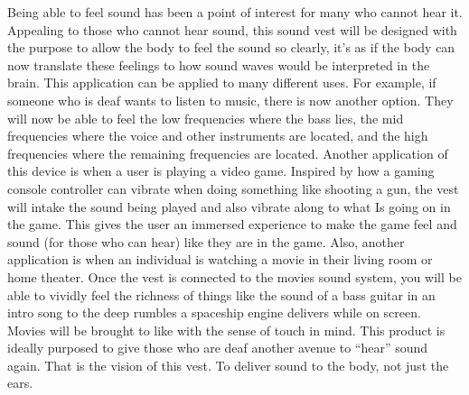 Being able to feel sound has been a point of interest for many who cannot hear it. Appealing to those who cannot hear sound, this sound vest will be designed with the purpose to allow the body to feel the sound so clearly, it’s as if the body can now translate these feelings to how sound waves would be interpreted in the brain. This application can be applied to many different uses. For example, if someone who is deaf wants to listen to music, there is now another option. They will now be able to feel the low frequencies where the bass lies, the mid frequencies where the voice and other instruments are located, and the high frequencies where the remaining frequencies are  located. Another application of this device is when a user is playing a video game. Inspired by how a gaming console controller can vibrate when doing something like shooting a gun, the vest will intake the sound being played and also vibrate along to what Is going on in the game. This gives the user an immersed experience to make the game feel and sound (for those who can hear) like they are in the game. Also, another application is when an individual is watching a movie in their living room or home theater. Once the vest is connected to the movies sound system, you will be able to vividly feel the richness of things like the sound of a bass guitar in an intro song to the deep rumbles a spaceship engine delivers while on screen. Movies will be brought to like with the sense of touch in mind. This product is ideally purposed to give those who are deaf another avenue to “hear” sound again. That is the vision of this vest. To deliver sound to the body, not just the ears.  
